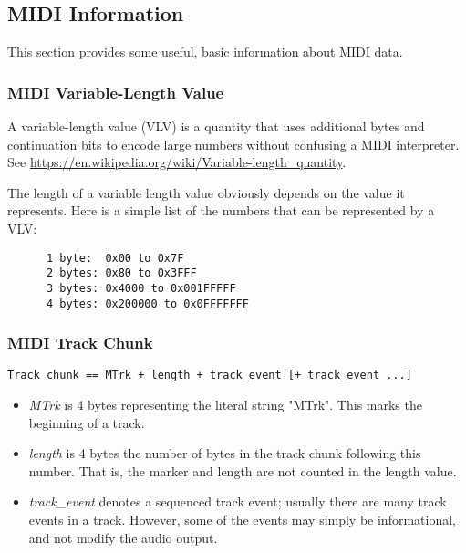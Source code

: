 \subsection{MIDI Information}
\label{subsec:midi_information}

   This section provides some useful, basic information about MIDI data.

\subsubsection{MIDI Variable-Length Value}
\label{subsubsec:midi_variable_length_value}

   A variable-length value (VLV) is a quantity that uses additional bytes
   and continuation bits to encode large numbers without confusing a MIDI
   interpreter.
   See \url{https://en.wikipedia.org/wiki/Variable-length\_quantity}.

   The length of a variable length value obviously depends on the value it
   represents.  Here is a simple list of the numbers that can be represented
   by a VLV:

   \begin{verbatim}
      1 byte:  0x00 to 0x7F
      2 bytes: 0x80 to 0x3FFF
      3 bytes: 0x4000 to 0x001FFFFF
      4 bytes: 0x200000 to 0x0FFFFFFF
   \end{verbatim}

\subsubsection{MIDI Track Chunk}
\label{subsubsec:midi_track_chunk}

   \texttt{Track chunk == MTrk + length + track\_event [+ track\_event ...]}

   \begin{itemize}
      \item \textsl{MTrk} is 4 bytes representing the literal string "MTrk".
         This marks the beginning of a track.
      \item \textsl{length} is 4 bytes the number of bytes in the track
         chunk following this number.  That is, the marker and length are
         not counted in the length value.
      \item \textsl{track\_event} denotes a sequenced track event; usually
         there are many track events in a  track.  However, some of the
         events may simply be informational, and not modify the audio
         output.
   \end{itemize}

